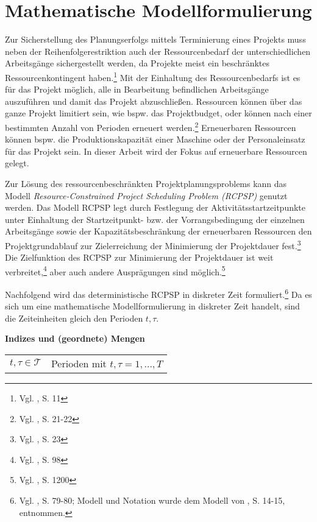 \documentclass[a4paper,12pt,normalheadings,footexclude,headinclude,liststotoc,nochapterprefix,onecolumn,oneside,parskip,pointlessnumbers]{scrreprt}
\begin{document}
\section{Mathematische Modellformulierung}
Zur Sicherstellung des Planungserfolgs mittels Terminierung eines Projekts muss neben der Reihenfolgerestriktion auch der Ressourcenbedarf der unterschiedlichen Arbeitsgänge sichergestellt werden, da Projekte meist ein beschränktes Ressourcenkontingent haben.\footnote{Vgl. \cite{kellenbrink2014einfuhrung}, S. 11} Mit der Einhaltung des Ressourcenbedarfs ist es für das Projekt möglich, alle in Bearbeitung befindlichen Arbeitsgänge auszuführen und damit das Projekt abzuschließen. Ressourcen können über das ganze Projekt limitiert sein, wie bspw. das Projektbudget, oder können nach einer bestimmten Anzahl von Perioden erneuert werden.\footnote{Vgl. \cite{neumann2003project}, S. 21-22} Erneuerbaren Ressourcen können bspw. die Produktionskapazität einer Maschine oder der Personaleinsatz für das Projekt sein. In dieser Arbeit wird der Fokus auf erneuerbare Ressourcen gelegt.

Zur Lösung des ressourcenbeschränkten Projektplanungsproblems kann das Modell \textit{Resource-Constrained Project Scheduling Problem (RCPSP)} genutzt werden. Das Modell RCPSP legt durch Festlegung der Aktivitätsstartzeitpunkte unter Einhaltung der Startzeitpunkt- bzw. der Vorrangsbedingung der einzelnen Arbeitsgänge sowie der Kapazitätsbeschränkung der erneuerbaren Ressourcen den Projektgrundablauf zur Zielerreichung der Minimierung der Projektdauer fest.\footnote{Vgl. \cite{demeulemeester2011robust}, S. 23} Die Zielfunktion des RCPSP zur Minimierung der Projektdauer ist weit verbreitet,\footnote{Vgl. \cite{drexl1997neuere}, S. 98} aber auch andere Ausprägungen sind möglich.\footnote{Vgl. \cite{talbot1982resource}, S. 1200}

Nachfolgend wird das deterministische RCPSP in diskreter Zeit formuliert.\footnote{Vgl. \cite{klein2000resource}, S. 79-80; Modell und Notation wurde dem Modell von \cite{kellenbrink2014einfuhrung}, S. 14-15, entnommen.} Da es sich um eine mathematische Modellformulierung in diskreter Zeit handelt, sind die Zeiteinheiten gleich den Perioden $t, \tau$.


\textbf{Indizes und (geordnete) Mengen}
\begin{table}[h!]
    \vspace*{-3mm}
    \hspace*{2mm}
  \renewcommand{\arraystretch}{1,5}
   \begin{tabular}{ll}  %
$t,\tau \in \mathcal{T}$	& Perioden mit $t,\tau = 1,...,T$\\ 
	\end{tabular}
\end{table}
\end{document}

